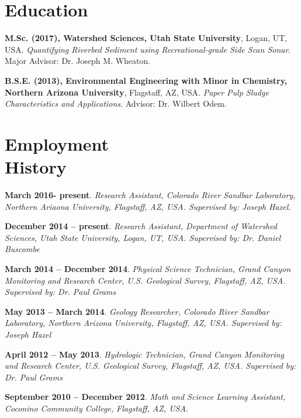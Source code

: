 \documentclass[margin,line]{resume}
\begin{document}
\begin{resume}
    \section{\mysidestyle Education}
    \begin{footnotesize}

    {\bf M.Sc. (2017), Watershed Sciences, Utah State University}, Logan, UT, USA. {\sl Quantifying Riverbed Sediment using Recreational-grade Side Scan Sonar}. Major Advisor:  Dr. Joseph M. Wheaton.\vspace{2mm}

    {\bf B.S.E. (2013), Environmental Engineering with Minor in Chemistry, Northern Arizona University}, Flagstaff, AZ, USA.  {\sl Paper Pulp Sludge Characteristics and Applications}. Advisor:  Dr. Wilbert Odem. \vspace{2mm}
     \end{footnotesize}

    \section{\mysidestyle Employment\\History}
    \begin{footnotesize}
    	
    {\bf March 2016- present}. {\sl Research Assistant, Colorado River Sandbar Laboratory, Northern Ariaona University, Flagstaff, AZ, USA. Supervised by: Joseph Hazel. }

    {\bf December 2014 -- present}. {\sl Research Assistant, Department of Watershed Sciences, Utah State University, Logan, UT, USA. Supervised by: Dr. Daniel Buscombe}
    
    {\bf March 2014 -- December 2014}. {\sl Physical Science Technician, Grand Canyon Monitoring and Research Center, U.S. Geological Survey, Flagstaff, AZ, USA. Supervised by: Dr. Paul Grams}

    {\bf May 2013 -- March 2014}. {\sl Geology Researcher, Colorado River Sandbar Laboratory, Northern Arizona University, Flagstaff, AZ, USA. Supervised by: Joseph Hazel}
    
    {\bf April 2012 -- May 2013}. {\sl Hydrologic Technician, Grand Canyon Monitoring and Research Center, U.S. Geological Survey, Flagstaff, AZ, USA. Supervised by: Dr. Paul Grams}
 
    {\bf September 2010 -- December 2012}. {\sl Math and Science Learning Assistant, Coconino Community College, Flagstaff, AZ, USA.}    
    

\end{footnotesize}
\end{resume}
\end{document}
